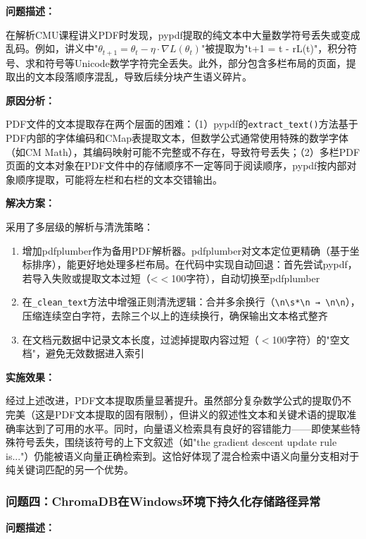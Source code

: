 \documentclass[10pt,a4paper]{article}
\begin{document}
\textbf{问题描述：}

在解析CMU课程讲义PDF时发现，pypdf提取的纯文本中大量数学符号丢失或变成乱码。例如，讲义中"$\theta_{t+1} = \theta_t - \eta\cdot\nabla L(\theta_t)$"被提取为"t+1 = t - rL(t)"，积分符号、求和符号等Unicode数学字符完全丢失。此外，部分包含多栏布局的页面，提取出的文本段落顺序混乱，导致后续分块产生语义碎片。

\textbf{原因分析：}

PDF文件的文本提取存在两个层面的困难：（1）pypdf的\texttt{extract\_text()}方法基于PDF内部的字体编码和CMap表提取文本，但数学公式通常使用特殊的数学字体（如CM Math），其编码映射可能不完整或不存在，导致符号丢失；（2）多栏PDF页面的文本对象在PDF文件中的存储顺序不一定等同于阅读顺序，pypdf按内部对象顺序提取，可能将左栏和右栏的文本交错输出。

\textbf{解决方案：}

采用了多层级的解析与清洗策略：

\begin{enumerate}[label=(\arabic*)]
\item 增加pdfplumber作为备用PDF解析器。pdfplumber对文本定位更精确（基于坐标排序），能更好地处理多栏布局。在代码中实现自动回退：首先尝试pypdf，若导入失败或提取文本过短（<$<$100字符），自动切换至pdfplumber
\item 在\texttt{\_clean\_text}方法中增强正则清洗逻辑：合并多余换行（\texttt{\textbackslash n\textbackslash s*\textbackslash n → \textbackslash n\textbackslash n}），压缩连续空白字符，去除三个以上的连续换行，确保输出文本格式整齐
\item 在文档元数据中记录文本长度，过滤掉提取内容过短（$<$100字符）的"空文档"，避免无效数据进入索引
\end{enumerate}

\textbf{实施效果：}

经过上述改进，PDF文本提取质量显著提升。虽然部分复杂数学公式的提取仍不完美（这是PDF文本提取的固有限制），但讲义的叙述性文本和关键术语的提取准确率达到了可用的水平。同时，向量语义检索具有良好的容错能力——即使某些特殊符号丢失，围绕该符号的上下文叙述（如"the gradient descent update rule is..."）仍能被语义向量正确检索到。这恰好体现了混合检索中语义向量分支相对于纯关键词匹配的另一个优势。

\subsubsection{问题四：ChromaDB在Windows环境下持久化存储路径异常}

\textbf{问题描述：}
\end{document}
